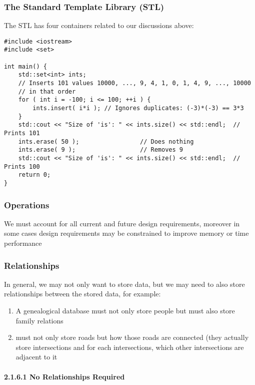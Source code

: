 \documentclass[11pt]{article}
\theoremstyle{definition}
\begin{document}
\subsubsection{The Standard Template Library (STL)}
The STL has four containers related to our discussions above:

\begin{table}[!h]
\end{table}
\begin{lstlisting}
#include <iostream> 
#include <set>

int main() {
    std::set<int> ints;
    // Inserts 101 values 10000, ..., 9, 4, 1, 0, 1, 4, 9, ..., 10000 
    // in that order 
    for ( int i = -100; i <= 100; ++i ) {
        ints.insert( i*i ); // Ignores duplicates: (-3)*(-3) == 3*3 
    }
    std::cout << "Size of 'is': " << ints.size() << std::endl;  // Prints 101
    ints.erase( 50 );                 // Does nothing
    ints.erase( 9 );                  // Removes 9
    std::cout << "Size of 'is': " << ints.size() << std::endl;  // Prints 100
    return 0; 
}
\end{lstlisting}
\subsubsection{Operations}
We must account for all current and future design requirements, moreover in some cases design requirements may be constrained to improve memory or time performance
\subsubsection{Relationships}
In general, we may not only want to store data, but we may need to also store relationships between the stored data, for example:
\begin{enumerate}
    \item A genealogical database must not only store people but must also store family relations
    \item {} must not only store roads but how those roads are connected (they actually store intersections and for each intersections, which other intersections are adjacent to it
\end{enumerate}
\paragraph{2.1.6.1 No Relationships Required}
\end{document}
